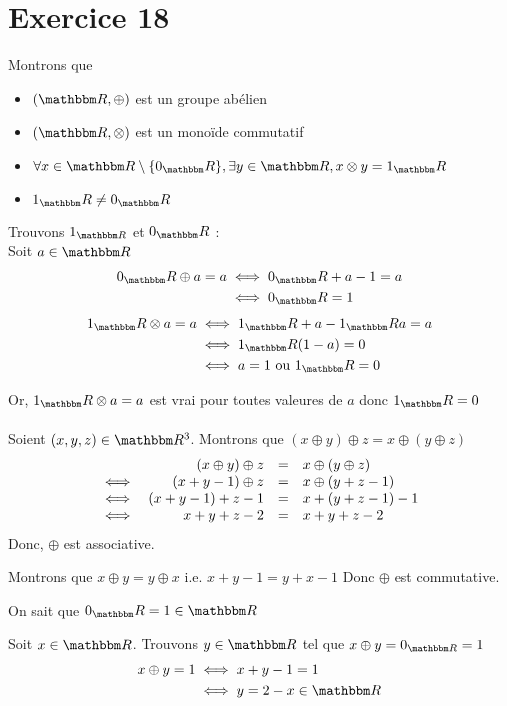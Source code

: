 \part{Exercice 18}

Montrons que 
\begin{itemize}
	\item $(\R,\oplus)$ est un groupe abélien
	\item $(\R,\otimes)$ est un monoïde commutatif
	\item $\forall x \in \R \setminus \{0_\R\}, \exists y \in \R, x \otimes y = 1_\R$
	\item $1_\R \neq  0_\R$
\end{itemize}\vspace{2mm}

Trouvons $1_{\R}$ et $0_\R$ :\\
Soit $a \in \R$
\begin{align*}
	0_\R \oplus a = a &\iff 0_\R + a - 1 = a\\
										&\iff 0_\R = 1
\end{align*}
\begin{align*}
	1_\R \otimes a = a &\iff 1_\R + a - 1_\R a = a\\
										 &\iff 1_\R (1-a) = 0\\
										 &\iff a = 1 \text{ ou } 1_\R = 0
\end{align*}

Or, $1_\R \otimes a = a$ est vrai pour toutes valeures de $a$ donc $1_\R = 0$ \\

\\

Soient $(x,y,z) \in \R^3$.
Montrons que $(x \oplus y) \oplus z = x \oplus (y \oplus z)$
\[
	\begin{array}{c r c l}
		&(x \oplus y) \oplus z &=& x \oplus (y \oplus z) \\
		\iff& (x + y - 1) \oplus z &=& x \oplus (y + z - 1)\\
		\iff& (x+y-1) + z - 1 &=& x + (y + z -1) -1 \\
		\iff& x+y+z-2 &=& x+y+z-2
	\end{array}
\]
Donc, $\oplus$ est associative.

Montrons que $x \oplus y = y \oplus x$ i.e. $x + y -1 = y + x - 1$
Donc  $\oplus$ est commutative.

On sait que $0_\R = 1 \in \R$

Soit $x \in \R$.
Trouvons $y \in \R$ tel que $x \oplus y = 0_{\R} = 1$ \\
\begin{align*}
	x \oplus y = 1 &\iff x + y - 1 = 1\\
								 &\iff y = 2-x \in \R
\end{align*}

